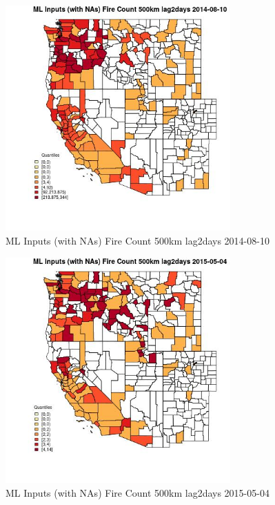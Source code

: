 \begin{figure} 
\centering  
\includegraphics[width=0.77\textwidth]{Code_Outputs/Report_ML_input_PM25_Step4_part_e_de_duplicated_aves_compiled_2019-05-18wNAs_CountyFire_Count_500km_lag2daysMean2014-08-10_2014-08-10.jpg} 
\caption{\label{fig:Report_ML_input_PM25_Step4_part_e_de_duplicated_aves_compiled_2019-05-18wNAsCountyFire_Count_500km_lag2daysMean2014-08-10_2014-08-10}ML Inputs (with NAs) Fire Count 500km lag2days 2014-08-10} 
\end{figure} 
 

\begin{figure} 
\centering  
\includegraphics[width=0.77\textwidth]{Code_Outputs/Report_ML_input_PM25_Step4_part_e_de_duplicated_aves_compiled_2019-05-18wNAs_CountyFire_Count_500km_lag2daysMean2015-05-04_2015-05-04.jpg} 
\caption{\label{fig:Report_ML_input_PM25_Step4_part_e_de_duplicated_aves_compiled_2019-05-18wNAsCountyFire_Count_500km_lag2daysMean2015-05-04_2015-05-04}ML Inputs (with NAs) Fire Count 500km lag2days 2015-05-04} 
\end{figure} 
 

